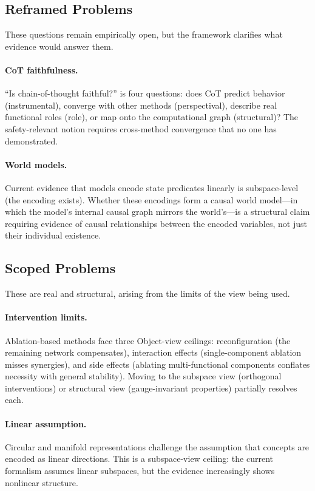 \documentclass[11pt]{article}
\theoremstyle{remark}
\begin{document}
\subsection{Reframed Problems}

These questions remain empirically open, but the framework clarifies
what evidence would answer them.

\paragraph{CoT faithfulness.}
``Is chain-of-thought faithful?'' is four questions: does CoT predict
behavior (instrumental), converge with other methods (perspectival),
describe real functional roles (role), or map onto the computational
graph (structural)?  The safety-relevant notion requires cross-method
convergence that no one has demonstrated.

\paragraph{World models.}
Current evidence that models encode state predicates linearly is
subspace-level (the encoding exists).  Whether these encodings form a
causal world model---in which the model's internal causal graph mirrors
the world's---is a structural claim requiring evidence of causal
relationships between the encoded variables, not just their individual
existence.

\subsection{Scoped Problems}

These are real and structural, arising from the limits of the view
being used.

\paragraph{Intervention limits.}
Ablation-based methods face three Object-view ceilings: reconfiguration
(the remaining network compensates), interaction effects (single-component
ablation misses synergies), and side effects (ablating multi-functional
components conflates necessity with general stability).  Moving to the
subspace view (orthogonal interventions) or structural view
(gauge-invariant properties) partially resolves each.

\paragraph{Linear assumption.}
Circular and manifold representations challenge the assumption that
concepts are encoded as linear directions.  This is a subspace-view
ceiling: the current formalism assumes linear subspaces, but the
evidence increasingly shows nonlinear structure.
\end{document}
